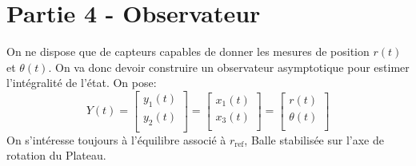 \documentclass[class=article, crop=false]{standalone}
\begin{document}
\section{Partie 4 - Observateur}
On ne dispose que de capteurs capables de donner les mesures de position $r(t)$ et $\theta(t)$. On va donc devoir construire un observateur asymptotique pour estimer l'intégralité de l'état. On pose:
\begin{equation}
    Y(t) = 
    \begin{bmatrix}
        y_1(t)\\
        y_2(t)\\
    \end{bmatrix}
    =
    \begin{bmatrix}
        x_1(t)\\
        x_3(t)\\
    \end{bmatrix}
    =
    \begin{bmatrix}
        r(t)\\
        \theta(t)\\
    \end{bmatrix}
\end{equation}
On s'intéresse toujours à l'équilibre associé à $r_{\text{ref}}$, Balle stabilisée sur l'axe de rotation du Plateau.

\newpage
\end{document}
